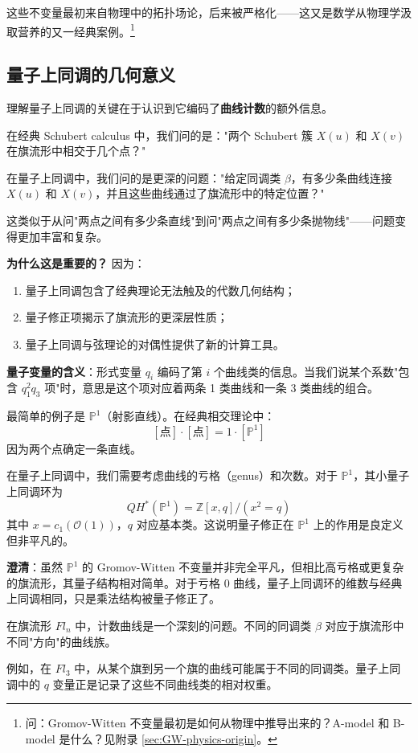 这些不变量最初来自物理中的拓扑场论，后来被严格化——这又是数学从物理学汲取营养的又一经典案例。\footnote{问：Gromov-Witten 不变量最初是如何从物理中推导出来的？A-model 和 B-model 是什么？见附录 \cref{sec:GW-physics-origin}。}

\subsection{量子上同调的几何意义}

理解量子上同调的关键在于认识到它编码了\textbf{曲线计数}的额外信息。

在经典 Schubert calculus 中，我们问的是："两个 Schubert 簇 $X(u)$ 和 $X(v)$ 在旗流形中相交于几个点？"

在量子上同调中，我们问的是更深的问题："给定同调类 $\beta$，有多少条曲线连接 $X(u)$ 和 $X(v)$，并且这些曲线通过了旗流形中的特定位置？"

这类似于从问"两点之间有多少条直线"到问"两点之间有多少条抛物线"——问题变得更加丰富和复杂。

\textbf{为什么这是重要的？} 因为：
\begin{enumerate}
\item 量子上同调包含了经典理论无法触及的代数几何结构；
\item 量子修正项揭示了旗流形的更深层性质；
\item 量子上同调与弦理论的对偶性提供了新的计算工具。
\end{enumerate}

\textbf{量子变量的含义}：形式变量 $q_i$ 编码了第 $i$ 个曲线类的信息。当我们说某个系数"包含 $q_1^2 q_3$ 项"时，意思是这个项对应着两条 1 类曲线和一条 3 类曲线的组合。

\begin{Example}
最简单的例子是 $\mathbb{P}^1$（射影直线）。在经典相交理论中：
\[
[\text{点}] \cdot [\text{点}] = 1 \cdot [\mathbb{P}^1]
\]
因为两个点确定一条直线。

在量子上同调中，我们需要考虑曲线的亏格（genus）和次数。对于 $\mathbb{P}^1$，其小量子上同调环为
$$QH^*(\mathbb{P}^1) = \mathbb{Z}[x, q] / (x^2 = q)$$
其中 $x = c_1(\mathcal{O}(1))$，$q$ 对应基本类。这说明量子修正在 $\mathbb{P}^1$ 上的作用是良定义但非平凡的。

\textbf{澄清}：虽然 $\mathbb{P}^1$ 的 Gromov-Witten 不变量并非完全平凡，但相比高亏格或更复杂的旗流形，其量子结构相对简单。对于亏格 0 曲线，量子上同调环的维数与经典上同调相同，只是乘法结构被量子修正了。
\end{Example}

\begin{Example}[旗流形上的曲线计数]
在旗流形 $Fl_n$ 中，计数曲线是一个深刻的问题。不同的同调类 $\beta$ 对应于旗流形中不同"方向"的曲线族。

例如，在 $Fl_3$ 中，从某个旗到另一个旗的曲线可能属于不同的同调类。量子上同调中的 $q$ 变量正是记录了这些不同曲线类的相对权重。
\end{Example}

